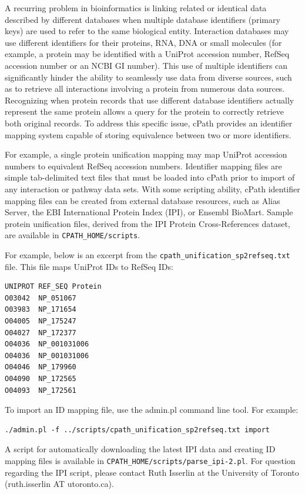 \documentclass[letterpaper,12pt]{article}
\begin{document}
A recurring problem in bioinformatics is linking related or identical data described by different databases when multiple database identifiers (primary keys) are used to refer
to the same biological entity. Interaction databases may use different identifiers for their proteins, RNA, DNA or small molecules (for example, a protein may be identified with a UniProt accession number, RefSeq accession number or an NCBI GI number). This use of multiple
identifiers can significantly hinder the ability to seamlessly use data from diverse sources, such as to retrieve all interactions involving a protein from numerous data sources. Recognizing when protein records that use different database identifiers actually represent the same protein allows a query for the protein to correctly retrieve both original records. To address this specific issue, cPath provides an identifier mapping system capable of
storing equivalence between two or more identifiers. 

For example, a single protein unification mapping may map UniProt accession numbers to equivalent RefSeq accession numbers. Identifier mapping files are simple tab-delimited text files that must be loaded into cPath prior to import of any interaction or pathway data sets. With some scripting ability, cPath identifier mapping files can be created from external database resources, such as Alias Server, the EBI International Protein Index (IPI), or Ensembl BioMart. Sample protein unification files, derived from the IPI Protein Cross-References dataset, are available in \verb+CPATH_HOME/scripts+.

For example, below is an excerpt from the \verb+cpath_unification_sp2refseq.txt+ file.  This file maps UniProt IDs to RefSeq IDs:

\begin{verbatim}
UNIPROT REF_SEQ Protein
O03042  NP_051067
O03983  NP_171654
O04005  NP_175247
O04027  NP_172377
O04036  NP_001031006
O04036  NP_001031006
O04046  NP_179960
O04090  NP_172565
O04093  NP_172561
\end{verbatim}

To import an ID mapping file, use the admin.pl command line tool.  For example:

\begin{verbatim}
./admin.pl -f ../scripts/cpath_unification_sp2refseq.txt import
\end{verbatim}

A script for automatically downloading the latest IPI data and creating ID mapping files is available in \verb+CPATH_HOME/scripts/parse_ipi-2.pl+.  For question regarding the IPI script, please contact Ruth Isserlin at the University of Toronto (ruth.isserlin AT utoronto.ca).
\end{document}

